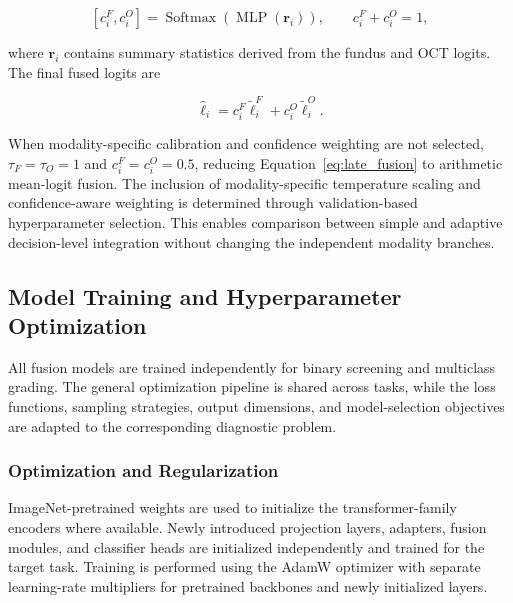 \documentclass[preprint,12pt]{elsarticle}
\begin{document}
\begin{equation}
    \left[
        c_{i}^{F},
        c_{i}^{O}
        \right]
    =
    \operatorname{Softmax}
    \left(
    \operatorname{MLP}
    \left(
        \mathbf{r}_{i}
        \right)
    \right),
    \qquad
    c_{i}^{F}+c_{i}^{O}=1,
    \label{eq:late_confidence}
\end{equation}

where $\mathbf{r}_{i}$ contains summary statistics derived from the fundus and OCT logits. The final fused logits are

\begin{equation}
    \hat{\boldsymbol{\ell}}_{i}
    =
    c_{i}^{F}\tilde{\boldsymbol{\ell}}_{i}^{F}
    +
    c_{i}^{O}\tilde{\boldsymbol{\ell}}_{i}^{O}.
    \label{eq:late_fusion}
\end{equation}

When modality-specific calibration and confidence weighting are not selected, $\tau_F=\tau_O=1$ and $c_i^F=c_i^O=0.5$, reducing Equation~\eqref{eq:late_fusion} to arithmetic mean-logit fusion. The inclusion of modality-specific temperature scaling and confidence-aware weighting is determined through validation-based hyperparameter selection. This enables comparison between simple and adaptive decision-level integration without changing the independent modality branches.

\subsection{Model Training and Hyperparameter Optimization}
\label{subsec:model_training}

All fusion models are trained independently for binary screening and multiclass grading. The general optimization pipeline is shared across tasks, while the loss functions, sampling strategies, output dimensions, and model-selection objectives are adapted to the corresponding diagnostic problem.

\subsubsection{Optimization and Regularization}
\label{subsubsec:optimization}

ImageNet-pretrained weights are used to initialize the transformer-family encoders where available. Newly introduced projection layers, adapters, fusion modules, and classifier heads are initialized independently and trained for the target task. Training is performed using the AdamW optimizer with separate learning-rate multipliers for pretrained backbones and newly initialized layers.
\end{document}

